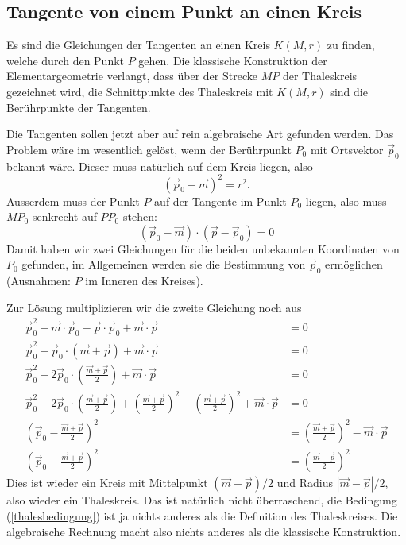 \subsection{Tangente von einem Punkt an einen Kreis}
Es sind die Gleichungen der Tangenten an einen Kreis $K(M,r)$ zu finden,
welche durch den Punkt $P$ gehen.
Die klassische Konstruktion der
Elementargeometrie verlangt, dass über der Strecke $MP$ der
Thaleskreis gezeichnet wird, die Schnittpunkte des Thaleskreis mit
$K(M,r)$ sind die Berührpunkte der Tangenten.

Die Tangenten sollen jetzt aber auf rein algebraische Art gefunden
werden.
Das Problem wäre im wesentlich gelöst, wenn der Berührpunkt $P_0$
mit Ortsvektor
$\vec p_0$ bekannt wäre.
Dieser muss natürlich auf dem Kreis liegen,
also
\[
(\vec p_0-\vec m)^2=r^2.
\]
Ausserdem muss der Punkt $P$ auf der Tangente im Punkt $P_0$ liegen,
also muss $MP_0$ senkrecht auf $PP_0$ stehen:
\begin{equation}
(\vec p_0-\vec m)\cdot(\vec p-\vec p_0)=0
\label{thalesbedingung}
\end{equation}
Damit haben wir zwei Gleichungen für die beiden unbekannten Koordinaten
von $P_0$ gefunden, im Allgemeinen werden sie die Bestimmung von $\vec p_0$
ermöglichen (Ausnahmen: $P$ im Inneren des Kreises).

Zur Lösung multiplizieren wir die zweite Gleichung noch aus
\begin{align*}
\vec p_0^2-\vec m\cdot\vec p_0-\vec p\cdot\vec p_0+\vec m\cdot\vec p&=0
\\
\vec p_0^2-\vec p_0\cdot (\vec m+\vec p)+\vec m\cdot\vec p&=0
\\
\vec p_0^2-2\vec p_0\cdot \left(\frac{\vec m+\vec p}{2}\right)+\vec m\cdot\vec p&=0
\\
\vec p_0^2-2\vec p_0\cdot \left(\frac{\vec m+\vec p}{2}\right)+
\left(\frac{\vec m+\vec p}2\right)^2
-\left(\frac{\vec m+\vec p}2\right)^2
+\vec m\cdot\vec p&=0
\\
\left(\vec p_0- \frac{\vec m+\vec p}{2}\right)^2
&=
\left(\frac{\vec m+\vec p}2\right)^2
-\vec m\cdot\vec p
\\
\left(\vec p_0- \frac{\vec m+\vec p}{2}\right)^2
&=
\left(\frac{\vec m-\vec p}2\right)^2
\end{align*}
Dies ist wieder ein Kreis mit Mittelpunkt $(\vec m+\vec p)/2$ und
Radius $|\vec m-\vec p|/2$, also wieder ein Thaleskreis.
Das ist natürlich nicht überraschend, die Bedingung (\ref{thalesbedingung})
ist ja nichts anderes als die Definition des Thaleskreises.
Die algebraische Rechnung macht also nichts anderes als die klassische
Konstruktion.
